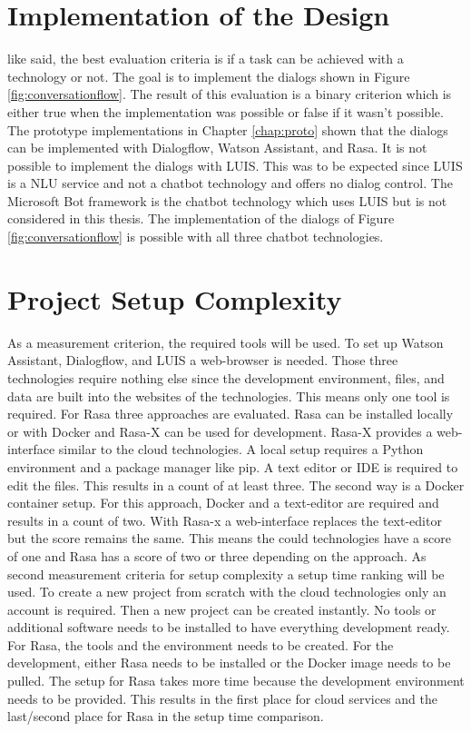 \section*{Implementation of the Design}
like \citet{singhbuilding} said, the best evaluation criteria is if a task can be achieved with a technology or not.
The goal is to implement the dialogs shown in Figure \ref{fig:conversationflow}.
The result of this evaluation is a binary criterion which is either true when the implementation was possible or false
if it wasn't possible.
The prototype implementations in Chapter \ref{chap:proto} shown that the dialogs can be 
implemented with Dialogflow, Watson Assistant, and Rasa.
It is not possible to implement the dialogs with LUIS. 
This was to be expected since LUIS is a NLU service and not a chatbot technology and offers no dialog control.
The Microsoft Bot framework is the chatbot technology which uses LUIS but 
is not considered in this thesis.
The implementation of the dialogs of Figure \ref{fig:conversationflow} is possible with all 
three chatbot technologies.


\section*{Project Setup Complexity} \label{sec:setup_complex}
As a measurement criterion, the required tools will be used.
To set up Watson Assistant, Dialogflow, and LUIS a web-browser is needed.
Those three technologies require nothing else since the development environment,
files, and data are built into the websites of the technologies.
This means only one tool is required.
For Rasa three approaches are evaluated.
Rasa can be installed locally or with Docker and Rasa-X can be used for development.
Rasa-X provides a web-interface similar to the cloud technologies.
A local setup requires a Python environment and a package manager like pip.
A text editor or IDE is required to edit the files.
This results in a count of at least three.
The second way is a Docker container setup.
For this approach, Docker and a text-editor are required and results in a count of two.
With Rasa-x a web-interface replaces the text-editor but the score remains the same.
This means the could technologies have a score of one and Rasa has a score of two or three
depending on the approach.
As second measurement criteria for setup complexity a setup time ranking will be used.
To create a new project from scratch with the cloud technologies only an account is required.
Then a new project can be created instantly.
No tools or additional software needs to be installed to have everything development ready.
For Rasa, the tools and the environment needs to be created.
For the development, either Rasa needs to be installed or the Docker image needs to be pulled.
The setup for Rasa takes more time because the development environment needs to be provided.
This results in the first place for cloud services and the last/second place for Rasa in the
setup time comparison. 

